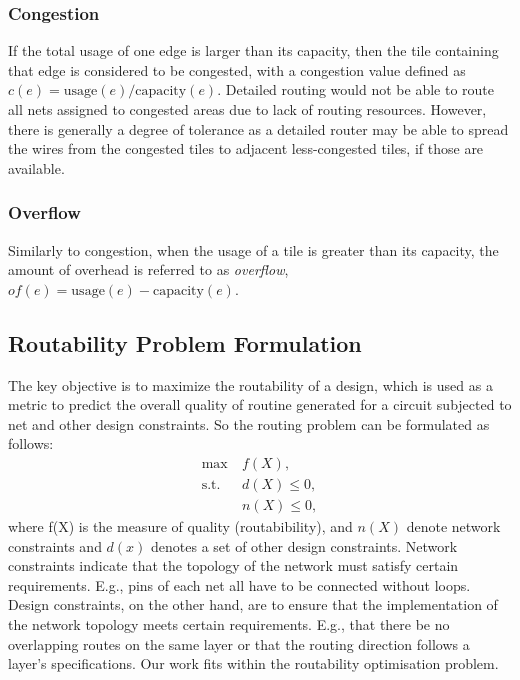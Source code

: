 \subsubsection{Congestion}
If the total usage of one edge is larger than its capacity, then the tile containing that edge is considered to be congested, with a congestion value defined as $c(e)=\text{usage}(e)/\text{capacity}(e)$. Detailed routing would not be able to route all nets assigned to congested areas due to lack of routing resources. However, there is generally a degree of tolerance as a detailed router may be able to spread the wires from the congested tiles to adjacent less-congested tiles, if those are available.
\subsubsection{Overflow}
Similarly to congestion, when the usage of a tile is greater than its capacity, the amount of overhead is referred to as {\it overflow}, $of(e)=\text{usage}(e)-\text{capacity}(e)$.

\subsection{Routability Problem Formulation}
The key objective is to maximize the routability of a design, which is used as a metric to predict the overall quality of routine generated for a  circuit subjected to net and other design constraints.
So the routing problem can be formulated as follows:
\begin{subequations}
\begin{align*}
    \max  \       & f(X), \\
    \text{s.t.}~~ & d(X) \leq 0, \\
                  & n(X) \leq 0,
\end{align*}
\end{subequations}
where f(X) is the measure of quality (routabibility), and $n(X)$ denote network constraints and $d(x)$ denotes a set of other design constraints.  Network constraints indicate that the topology of the network must satisfy certain requirements.  E.g., pins of each net all have to be  connected without loops. Design constraints, on the other hand, are to ensure that the implementation of the network topology meets certain requirements. E.g., that there be no overlapping routes on the same layer or that the routing direction follows a layer's specifications. Our work fits within the routability optimisation problem.

